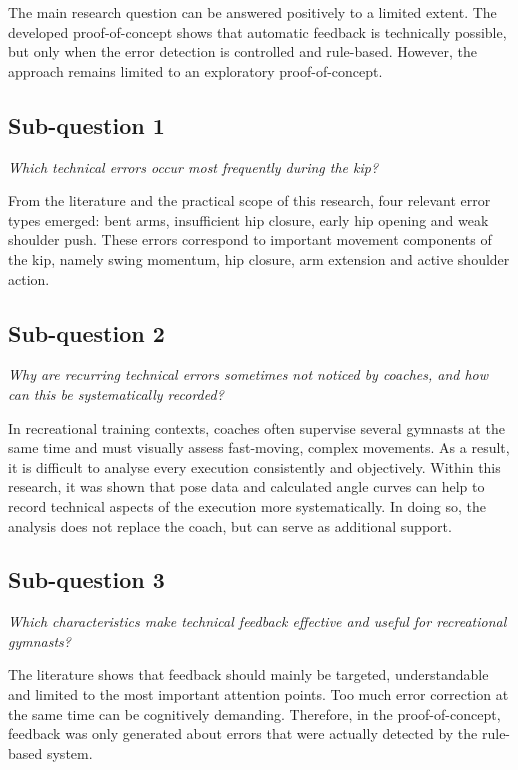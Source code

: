 The main research question can be answered positively to a limited extent. The developed proof-of-concept shows that automatic feedback is technically possible, but only when the error detection is controlled and rule-based. However, the approach remains limited to an exploratory proof-of-concept.

\subsection{Sub-question 1}

\textit{Which technical errors occur most frequently during the kip?}

From the literature and the practical scope of this research, four relevant error types emerged: bent arms, insufficient hip closure, early hip opening and weak shoulder push. These errors correspond to important movement components of the kip, namely swing momentum, hip closure, arm extension and active shoulder action.

\subsection{Sub-question 2}

\textit{Why are recurring technical errors sometimes not noticed by coaches, and how can this be systematically recorded?}

In recreational training contexts, coaches often supervise several gymnasts at the same time and must visually assess fast-moving, complex movements. As a result, it is difficult to analyse every execution consistently and objectively. Within this research, it was shown that pose data and calculated angle curves can help to record technical aspects of the execution more systematically. In doing so, the analysis does not replace the coach, but can serve as additional support.

\subsection{Sub-question 3}

\textit{Which characteristics make technical feedback effective and useful for recreational gymnasts?}

The literature shows that feedback should mainly be targeted, understandable and limited to the most important attention points. Too much error correction at the same time can be cognitively demanding. Therefore, in the proof-of-concept, feedback was only generated about errors that were actually detected by the rule-based system.

